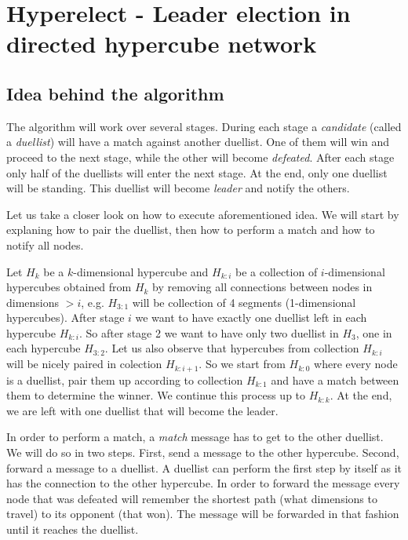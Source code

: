 \documentclass[11pt]{article}
\begin{document}
\section*{Hyperelect - Leader election in directed hypercube network}

\subsection*{Idea behind the algorithm}
The algorithm will work over several stages. During each stage a \textit{candidate} (called a \textit{duellist}) will have a match against another duellist. One of them will win and proceed to the next stage, while the other will become \textit{defeated}. After each stage only half of the duellists will enter the next stage. At the end, only one duellist will be standing. This duellist will become \textit{leader} and notify the others.

Let us take a closer look on how to execute aforementioned idea. We will start by explaning how to pair the duellist, then how to perform a match and how to notify all nodes. 

Let $H_{k}$ be a $k$-dimensional hypercube and $H_{k:i}$ be a collection of $i$-dimensional hypercubes obtained from $H_{k}$ by removing all connections between nodes in dimensions $>i$, e.g. $H_{3:1}$ will be collection of 4 segments (1-dimensional hypercubes). After stage $i$ we want to have exactly one duellist left in each hypercube $H_{k:i}$. So after stage 2 we want to have only two duellist in $H_{3}$, one in each hypercube $H_{3:2}$. Let us also observe that hypercubes from collection $H_{k:i}$ will be nicely paired in colection $H_{k:i+1}$. So we start from $H_{k:0}$ where every node is a duellist, pair them up according to collection $H_{k:1}$ and have a match between them to determine the winner. We continue this process up to $H_{k:k}$. At the end, we are left with one duellist that will become the leader.

In order to perform a match, a \textit{match} message has to get to the other duellist. We will do so in two steps. First, send a message to the other hypercube. Second, forward a message to a duellist. A duellist can perform the first step by itself as it has the connection to the other hypercube. In order to forward the message every node that was defeated will remember the shortest path (what dimensions to travel) to its opponent (that won). The message will be forwarded in that fashion until it reaches the duellist.
\end{document}

